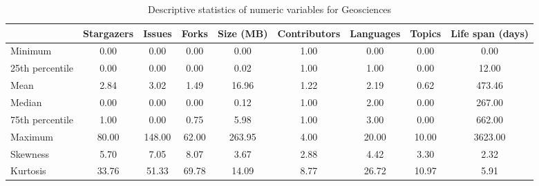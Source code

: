 
\begin{table}[h!]
\centering
\begin{adjustbox}{center}
\begin{tabular}{lcccccccc}
\toprule
{} &  Stargazers &  Issues &  Forks &  Size (MB) &  Contributors &  Languages &  Topics &  Life span (days) \\
\midrule
Minimum         &        0.00 &    0.00 &   0.00 &    0.00 &          1.00 &       0.00 &    0.00 &       0.00 \\
25th percentile &        0.00 &    0.00 &   0.00 &    0.02 &          1.00 &       1.00 &    0.00 &      12.00 \\
Mean            &        2.84 &    3.02 &   1.49 &   16.96 &          1.22 &       2.19 &    0.62 &     473.46 \\
Median          &        0.00 &    0.00 &   0.00 &    0.12 &          1.00 &       2.00 &    0.00 &     267.00 \\
75th percentile &        1.00 &    0.00 &   0.75 &    5.98 &          1.00 &       3.00 &    0.00 &     662.00 \\
Maximum         &       80.00 &  148.00 &  62.00 &  263.95 &          4.00 &      20.00 &   10.00 &    3623.00 \\
Skewness        &        5.70 &    7.05 &   8.07 &    3.67 &          2.88 &       4.42 &    3.30 &       2.32 \\
Kurtosis        &       33.76 &   51.33 &  69.78 &   14.09 &          8.77 &      26.72 &   10.97 &       5.91 \\
\bottomrule
\end{tabular}
\end{adjustbox}
\caption{Descriptive statistics of numeric variables for Geosciences}
\end{table}
